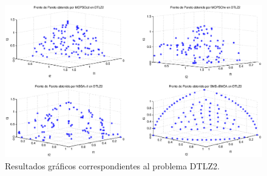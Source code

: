 \clearpage
\newpage

\begin{figure}
      \begin{center}
	  \includegraphics[scale=0.45]{Cap4/rdtlz2r.eps}
      \end{center}
	\caption{Resultados gr\'aficos correspondientes al problema DTLZ2.}
      \label{fig:rDTLZ2}
      \end{figure}

      \clearpage
      \newpage
 
